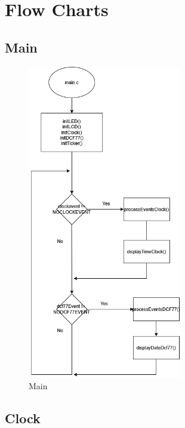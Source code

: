 \documentclass[a4paper,12pt]{article}
\begin{document}
\section{Flow Charts}

\subsection{Main}

\begin{figure}[H]
    \centering
    \includegraphics[width=0.6\textwidth]{diagrams/2.Main.png}
    \caption{Main}
    \label{fig:Main}
\end{figure}

\subsection{Clock}
\end{document}
